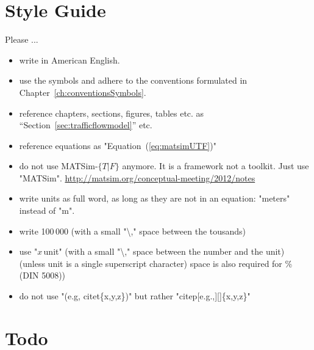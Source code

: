 



\section*{Style Guide}
\label{sec:styleguide}

Please ...

\begin{itemize}

\item write in American English.

\item use the symbols and adhere to the conventions formulated in Chapter~\ref{ch:conventionsSymbols}.

\item reference chapters, sections, figures, tables etc. as ``Section~\ref{sec:trafficflowmodel}'' etc.

\item reference equations as "Equation~(\ref{eq:matsimUTF})"

\item do not use MATSim-$\{T\lvert F\}$ anymore. It is a framework not a toolkit. Just use "MATSim". \url{http://matsim.org/conceptual-meeting/2012/notes}

\item write units as full word, as long as they are not in an equation: "meters" instead of "m".

\item write 100\,000 (with a small "\textbackslash," space between the tousands)

\item use "$x$\,unit" (with a small "\textbackslash," space between the number and the unit) (unless unit is a single superscript character) space is also required for \% (DIN 5008))

\item do not use "(e.g, citet\{x,y,z\})" but rather "citep[e.g.,][]\{x,y,z\}"

\end{itemize}

\vfill\eject

\section*{Todo}

